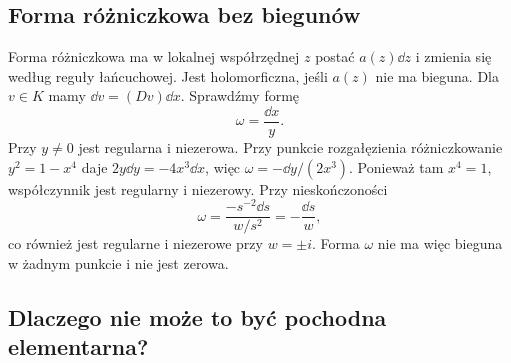 \subsection{Forma różniczkowa bez biegunów}

Forma różniczkowa ma w lokalnej współrzędnej $z$ postać $a(z)\dd z$ i zmienia się według reguły łańcuchowej. Jest holomorficzna, jeśli $a(z)$ nie ma bieguna. Dla $v\in K$ mamy $\dd v=(Dv)\dd x$. Sprawdźmy formę
\[
\omega=\frac{\dd x}{y}.
\]
Przy $y\ne0$ jest regularna i niezerowa. Przy punkcie rozgałęzienia różniczkowanie $y^2=1-x^4$ daje $2y\dd y=-4x^3\dd x$, więc $\omega=-\dd y/(2x^3)$. Ponieważ tam $x^4=1$, współczynnik jest regularny i niezerowy. Przy nieskończoności
\[
\omega=\frac{-s^{-2}\dd s}{w/s^2}=-\frac{\dd s}{w},
\]
co również jest regularne i niezerowe przy $w=\pm i$. Forma $\omega$ nie ma więc bieguna w żadnym punkcie i nie jest zerowa.

\subsection{Dlaczego nie może to być pochodna elementarna?}

